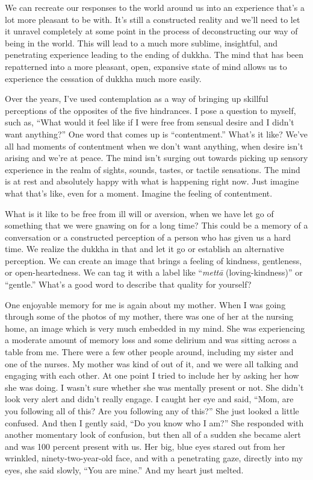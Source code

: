 We can recreate our responses to the world around us into an experience that's a lot more pleasant to be with. It's still a constructed reality and we'll need to let it unravel completely at some point in the process of deconstructing our way of being in the world. This will lead to a much more sublime, insightful, and penetrating experience leading to the ending of dukkha. The mind that has been repatterned into a more pleasant, open, expansive state of mind allows us to experience the cessation of dukkha much more easily.

Over the years, I've used contemplation as a way of bringing up skillful perceptions of the opposites of the five hindrances. I pose a question to myself, such as, ``What would it feel like if I were free from sensual desire and I didn't want anything?'' One word that comes up is ``contentment.'' What's it like? We've all had moments of contentment when we don't want anything, when desire isn't arising and we're at peace. The mind isn't surging out towards picking up sensory experience in the realm of sights, sounds, tastes, or tactile sensations. The mind is at rest and absolutely happy with what is happening right now. Just imagine what that's like, even for a moment. Imagine the feeling of contentment.

\enlargethispage{1\baselineskip}
What is it like to be free from ill will or aversion, when we have let go of something that we were gnawing on for a long time? This could be a memory of a conversation or a constructed perception of a person who has given us a hard time. We realize the dukkha in that and let it go or establish an alternative perception. We can create an image that brings a feeling of kindness, gentleness, or open-heartedness. We can tag it with a label like ``\emph{mettā} (loving-kindness)'' or ``gentle.'' What's a good word to describe that quality for yourself?

One enjoyable memory for me is again about my mother. When I was going through some of the photos of my mother, there was one of her at the nursing home, an image which is very much embedded in my mind. She was experiencing a moderate amount of memory loss and some delirium and was sitting across a table from me. There were a few other people around, including my sister and one of the nurses. My mother was kind of out of it, and we were all talking and engaging with each other. At one point I tried to include her by asking her how she was doing. I wasn't sure whether she was mentally present or not. She didn't look very alert and didn't really engage. I caught her eye and said, ``Mom, are you following all of this? Are you following any of this?'' She just looked a little confused. And then I gently said, ``Do you know who I am?'' She responded with another momentary look of confusion, but then all of a sudden she became alert and was 100 percent present with us. Her big, blue eyes stared out from her wrinkled, ninety-two-year-old face, and with a penetrating gaze, directly into my eyes, she said slowly, ``You are mine.'' And my heart just melted.

